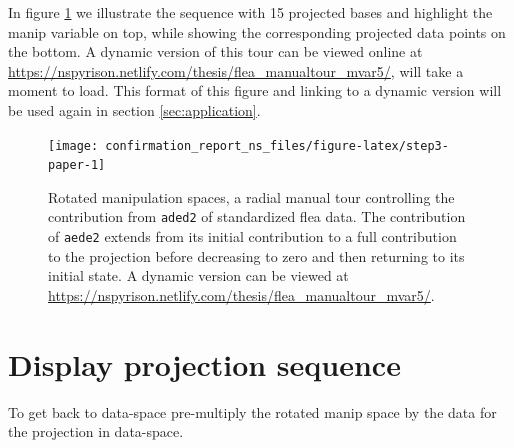 \documentclass{monashthesis}
\begin{document}
\begin{Shaded}
\begin{Highlighting}[]
 
\StringTok{ }\OperatorTok{+}\StringTok{ }
\StringTok{ }\NormalTok{(manip_space, theta, phi)[, }\OperatorTok{:}\NormalTok{]}
\NormalTok{\}}
\end{Highlighting}
\end{Shaded}

In figure \ref{fig:step3-paper} we illustrate the sequence with 15
projected bases and highlight the manip variable on top, while showing
the corresponding projected data points on the bottom. A dynamic version
of this tour can be viewed online at
\url{https://nspyrison.netlify.com/thesis/flea_manualtour_mvar5/}, will
take a moment to load. This format of this figure and linking to a
dynamic version will be used again in section \ref{sec:application}.









\begin{figure}

{\centering \texttt{[image: confirmation\_report\_ns\_files/figure-latex/step3-paper-1]} 

}

\caption{Rotated manipulation spaces, a radial manual tour
controlling the contribution from \texttt{aded2} of standardized flea
data. The contribution of \texttt{aede2} extends from its initial
contribution to a full contribution to the projection before decreasing
to zero and then returning to its initial state. A dynamic version can
be viewed at
\url{https://nspyrison.netlify.com/thesis/flea_manualtour_mvar5/}.}\label{fig:step3-paper}
\end{figure}

\section{Display projection
sequence}\label{display-projection-sequence-1}

To get back to data-space pre-multiply the rotated manip space by the
data for the projection in data-space.
\end{document}
